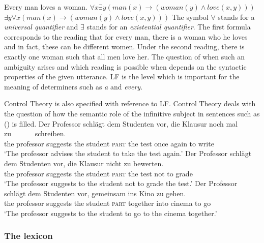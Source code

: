 \eal
\label{Beispiel-Every-man-loves-a-woman}
\ex Every man loves a woman.
\ex $\forall x \exists y (man(x) \to (woman(y) \wedge love(x,y)))$
\ex $\exists y \forall x (man(x) \to (woman(y) \wedge love(x,y)))$
\zl
The symbol $\forall$\is{$\forall$} stands for a \emph{universal quantifier} and $\exists$\is{$\exists$} stands for an
\emph{existential quantifier}. The first formula corresponds to the reading that for every man, there is a woman who he loves
and in fact, these can be different women. Under the second reading, there is exactly one woman such that all men love her. The question of when such an
ambiguity arises and which reading is possible when depends on the syntactic properties of the given utterance. LF is the level which is important for the
meaning of determiners such as \emph{a} and \emph{every}.

Control Theory is also specified with reference to LF. Control Theory deals with the question of how the semantic role of the infinitive
subject in sentences such as () is filled.
\eal
\ex 
\gll Der Professor schlägt dem Studenten vor, die Klausur noch mal zu~~~~~~ schreiben.\\
	 the professor suggests the student \textsc{part} the test once again to write\\
\glt `The professor advises the student to take the test again.'
\ex 
\gll Der Professor schlägt dem Studenten vor, die Klausur nicht zu bewerten.\\
	 the professor suggests the student \textsc{part} the test not to grade\\
\glt `The professor suggests to the student not to grade the test.'
\ex 
\gll Der Professor schlägt dem Studenten vor, gemeinsam ins Kino zu gehen.\hspace{-3pt}\\
	 the professor suggests the student \textsc{part} together into cinema to go\\
\glt `The professor suggests to the student to go to the cinema together.'
\zl
{}

\subsubsection{The lexicon}
\label{Abschnitt-GB-Lexikon}

